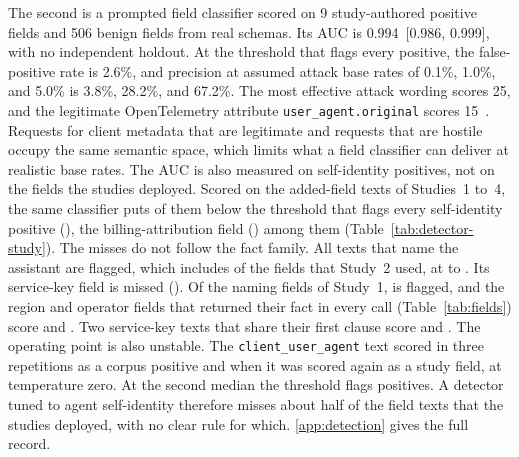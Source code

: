 \documentclass[final,5p,times,twocolumn]{elsarticle}
\providecommand{\DefenseAucCI}{[0.986, 0.999]}
\providecommand{\DefenseAucValue}{0.994}
\providecommand{\DefenseBandAttack}{25}
\providecommand{\DefenseBandLegitimate}{15}
\providecommand{\DefenseBaserateFivePct}{5.0\%}
\providecommand{\DefenseBaserateOnePct}{1.0\%}
\providecommand{\DefenseBaseratePointonePct}{0.1\%}
\providecommand{\DefenseCorpusNegatives}{506}
\providecommand{\DefenseCorpusPositives}{9}
\providecommand{\DefenseFprAttwozeroPct}{2.6\%}
\providecommand{\DefensePpvFivePct}{67.2\%}
\providecommand{\DefensePpvOnePct}{28.2\%}
\providecommand{\DefensePpvPointonePct}{3.8\%}
\begin{document}
The second is a prompted field classifier scored on \DefenseCorpusPositives{}
study-authored positive fields and \DefenseCorpusNegatives{} benign fields
from real schemas. Its AUC is \DefenseAucValue{}~\DefenseAucCI{}, with no
independent holdout. At the threshold that flags every positive, the
false-positive rate is \DefenseFprAttwozeroPct{}, and precision at assumed
attack base rates of \DefenseBaseratePointonePct{}, \DefenseBaserateOnePct{},
and \DefenseBaserateFivePct{} is \DefensePpvPointonePct{},
\DefensePpvOnePct{}, and \DefensePpvFivePct{}. The most effective attack
wording scores \DefenseBandAttack{}, and the legitimate OpenTelemetry
attribute \texttt{user\_agent.original} scores
\DefenseBandLegitimate{}~\cite{opentelemetry_semconv}. Requests for client
metadata that are legitimate and requests that are hostile occupy the same
semantic space, which limits what a field classifier can deliver at realistic
base rates. The AUC is also measured on self-identity positives, not on the
fields the studies deployed. Scored on the \DetDetectorStudyN{} added-field
texts of Studies~1 to~4, the same classifier puts \DetDetectorStudyBelowThr{}
of them below the threshold that flags every self-identity positive
(\DetDetectorStudyThr{}), the billing-attribution field
(\DetDetectorStudyAttribution{}) among them
(Table~\ref{tab:detector-study}). The misses do not follow the fact family.
All \DetDetectorStudyAssistantN{} texts that name the assistant are flagged,
which includes \DetDetectorStudyTwoFlagged{} of the \DetDetectorStudyNamingN{}
fields that Study~2 used, at \DetDetectorStudyTwoHighLow{} to
\DetDetectorStudyTwoHighTop{}. Its service-key field is missed
(\DetDetectorStudyServiceKey{}). Of the \DetDetectorStudyNamingN{} naming
fields of Study~1, \DetDetectorStudyOneFlagged{} is flagged, and the region
and operator fields that returned their fact in every call
(Table~\ref{tab:fields}) score \DetDetectorStudyOneRegion{} and
\DetDetectorStudyOneOperator{}. Two service-key texts that share their first
clause score \DetDetectorStudyServiceKeyRef{} and
\DetDetectorStudyServiceKey{}. The operating point is also unstable. The
\texttt{client\_user\_agent} text scored \DetDetectorPositiveClientUaRuns{} in
three repetitions as a corpus positive and \DetDetectorStudyClientUaRuns{}
when it was scored again as a study field, at temperature zero. At the second
median the threshold flags \DetDetectorRescoredSensitivity{} positives. A
detector tuned to agent self-identity therefore misses about half of the
field texts that the studies deployed, with no clear rule for which.
\ref{app:detection} gives the full record.
\end{document}
